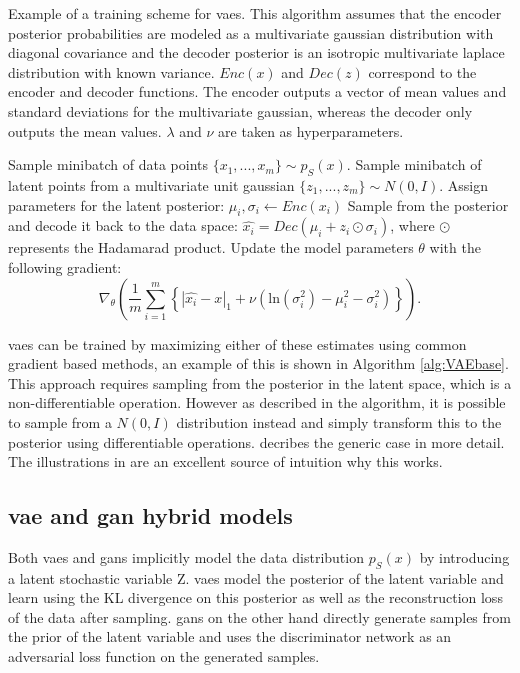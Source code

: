 \begin{algorithm}
    \caption{Example of a training scheme for \acrlong{vaes}. This algorithm assumes that the encoder posterior probabilities are modeled as a multivariate gaussian distribution with diagonal covariance and the decoder posterior is an isotropic multivariate laplace distribution with known variance. $Enc(x)$ and $Dec(z)$ correspond to the encoder and decoder functions. The encoder outputs a vector of mean values and standard deviations for the multivariate gaussian, whereas the decoder only outputs the mean values. $\lambda$ and $\nu$ are taken as hyperparameters.}
    \label{alg:VAEbase}
    \begin{algorithmic}[1]
        \STATE Sample minibatch of data points $\{x_{1}, ..., x_{m}\} \sim p_S(x)$.
        \STATE Sample minibatch of latent points from a multivariate unit gaussian $\{z_{1}, ..., z_{m}\} \sim N(0, I)$.
        \STATE Assign parameters for the latent posterior: $\mu_i, \sigma_i \leftarrow Enc(x_i)$
        \STATE Sample from the posterior and decode it back to the data space: $\hat{x_i} = Dec(\mu_i + z_i\odot\sigma_i)$, where $\odot$ represents the Hadamarad product.
        \STATE Update the model parameters $\theta$ with the following gradient:
        \begin{equation}
            \nonumber
            \nabla_\theta\left(\frac{1}{m}\sum_{i=1}^m\left\{|\hat{x_i} - x|_1 + \nu(\text{ln}(\sigma_i^2) - \mu_i^2 - \sigma_i^2)\right\}\right).
        \end{equation}
        \ENDFOR
    \end{algorithmic}
\end{algorithm}

\acrshort{vaes} can be trained by maximizing either of these estimates using common gradient based methods, an example of this is shown in Algorithm \ref{alg:VAEbase}. This approach requires sampling from the posterior in the latent space, which is a non-differentiable operation. However as described in the algorithm, it is possible to sample from a $N(0, I)$ distribution instead and simply transform this to the posterior using differentiable operations. \textcite{kingma2013auto} decribes the generic case in more detail. The illustrations in \parencite{doersch2016tutorial} are an excellent source of intuition why this works.

\subsection{\acrshort{vae} and \acrshort{gan} hybrid models}
Both \acrshort{vaes} and \acrshort{gans} implicitly model the data distribution $p_S(x)$ by introducing a latent stochastic variable Z. \acrshort{vaes} model the posterior of the latent variable and learn using the KL divergence on this posterior as well as the reconstruction loss of the data after sampling. \acrshort{gans} on the other hand directly generate samples from the prior of the latent variable and uses the discriminator network as an adversarial loss function on the generated samples. 

